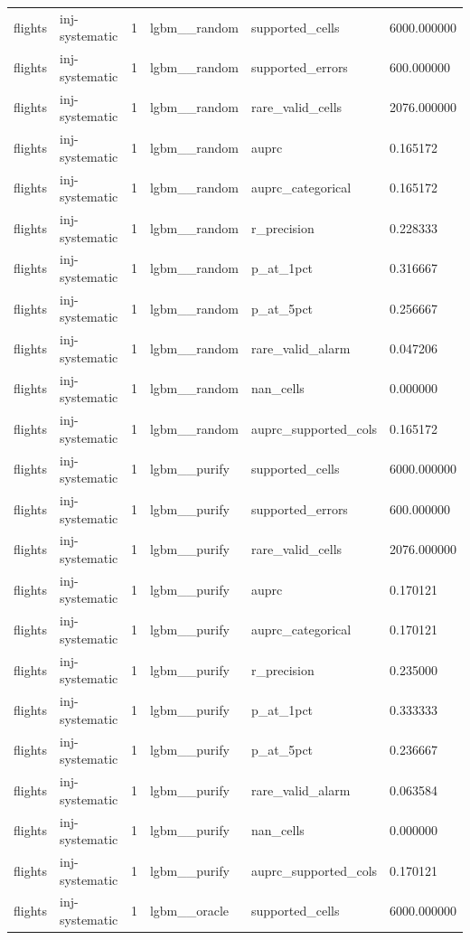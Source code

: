 \begin{tabular}{llllll}
flights & inj-systematic & 1 & lgbm\_\_random & supported\_cells & 6000.000000 \\
flights & inj-systematic & 1 & lgbm\_\_random & supported\_errors & 600.000000 \\
flights & inj-systematic & 1 & lgbm\_\_random & rare\_valid\_cells & 2076.000000 \\
flights & inj-systematic & 1 & lgbm\_\_random & auprc & 0.165172 \\
flights & inj-systematic & 1 & lgbm\_\_random & auprc\_categorical & 0.165172 \\
flights & inj-systematic & 1 & lgbm\_\_random & r\_precision & 0.228333 \\
flights & inj-systematic & 1 & lgbm\_\_random & p\_at\_1pct & 0.316667 \\
flights & inj-systematic & 1 & lgbm\_\_random & p\_at\_5pct & 0.256667 \\
flights & inj-systematic & 1 & lgbm\_\_random & rare\_valid\_alarm & 0.047206 \\
flights & inj-systematic & 1 & lgbm\_\_random & nan\_cells & 0.000000 \\
flights & inj-systematic & 1 & lgbm\_\_random & auprc\_supported\_cols & 0.165172 \\
flights & inj-systematic & 1 & lgbm\_\_purify & supported\_cells & 6000.000000 \\
flights & inj-systematic & 1 & lgbm\_\_purify & supported\_errors & 600.000000 \\
flights & inj-systematic & 1 & lgbm\_\_purify & rare\_valid\_cells & 2076.000000 \\
flights & inj-systematic & 1 & lgbm\_\_purify & auprc & 0.170121 \\
flights & inj-systematic & 1 & lgbm\_\_purify & auprc\_categorical & 0.170121 \\
flights & inj-systematic & 1 & lgbm\_\_purify & r\_precision & 0.235000 \\
flights & inj-systematic & 1 & lgbm\_\_purify & p\_at\_1pct & 0.333333 \\
flights & inj-systematic & 1 & lgbm\_\_purify & p\_at\_5pct & 0.236667 \\
flights & inj-systematic & 1 & lgbm\_\_purify & rare\_valid\_alarm & 0.063584 \\
flights & inj-systematic & 1 & lgbm\_\_purify & nan\_cells & 0.000000 \\
flights & inj-systematic & 1 & lgbm\_\_purify & auprc\_supported\_cols & 0.170121 \\
flights & inj-systematic & 1 & lgbm\_\_oracle & supported\_cells & 6000.000000 \\

\end{tabular}
